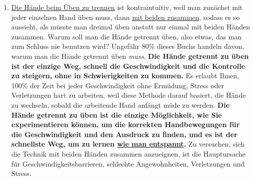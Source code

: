 \begin{enumerate}[label={\arabic*.}] 
\item \hyperref[c1ii7]{Die Hände beim Üben zu trennen} ist kontraintuitiv, weil man zunächst mit jeder einzelnen Hand üben muss, dann \hyperref[c1ii25]{mit beiden zusammen}, sodass es so aussieht, als müsste man dreimal üben anstatt nur einmal mit beiden Händen zusammen.
Warum soll man die Hände getrennt üben, also etwas, das man zum Schluss nie benutzen wird?
Ungefähr 80\% dieses Buchs handeln davon, warum man die Hände getrennt üben \textit{muss}.
\textbf{Die Hände getrennt zu üben ist der einzige Weg, schnell die Geschwindigkeit und die Kontrolle zu steigern, ohne in Schwierigkeiten zu kommen.}
Es erlaubt Ihnen, 100\% der Zeit bei jeder Geschwindigkeit ohne Ermüdung, Stress oder Verletzungen hart zu arbeiten, weil diese Methode darauf basiert, die Hände zu wechseln, sobald die arbeitende Hand anfängt müde zu werden.
\textbf{Die Hände getrennt zu üben ist die einzige Möglichkeit, wie Sie experimentieren können, um die korrekten Handbewegungen für die Geschwindigkeit und den Ausdruck zu finden, und es ist der schnellste Weg, um zu lernen \hyperref[c1ii14]{wie man entspannt}.}
Zu versuchen, sich die Technik mit beiden Händen zusammen anzueignen, ist die Hauptursache für Geschwindigkeitsbarrieren, schlechte Angewohnheiten, Verletzungen und Stress.


\end{enumerate}

